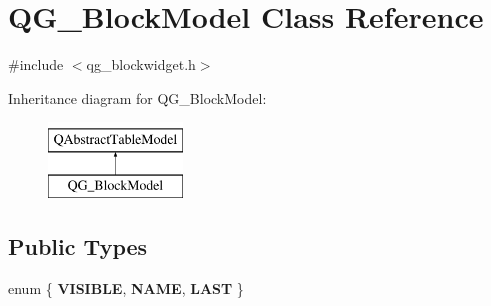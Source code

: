 \hypertarget{classQG__BlockModel}{\section{Q\-G\-\_\-\-Block\-Model Class Reference}
\label{classQG__BlockModel}
}


{\ttfamily \#include $<$qg\-\_\-blockwidget.\-h$>$}

Inheritance diagram for Q\-G\-\_\-\-Block\-Model\-:\begin{figure}[H]
\begin{center}
\leavevmode
\includegraphics[height=2.000000cm]{classQG__BlockModel}
\end{center}
\end{figure}
\subsection*{Public Types}
\begin{DoxyCompactItemize}
\item 
enum \{ {\bfseries V\-I\-S\-I\-B\-L\-E}, 
{\bfseries N\-A\-M\-E}, 
{\bfseries L\-A\-S\-T}
 \}
\end{DoxyCompactItemize}
